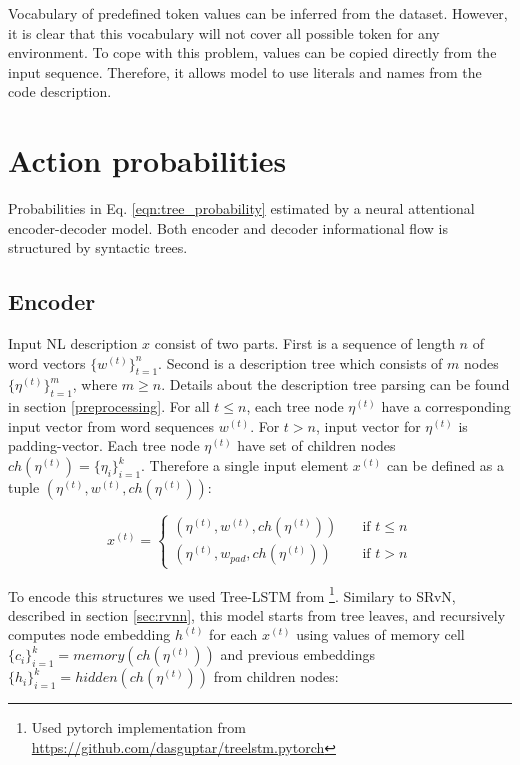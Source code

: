 Vocabulary of predefined token values can be inferred from the dataset. However, it is clear that this vocabulary will not cover all possible token for any environment. To cope with this problem, values can be copied directly from the input sequence. Therefore, it allows model to use literals and names from the code description.

\section{Action probabilities}
Probabilities in Eq. \ref{eqn:tree_probability} estimated by a neural attentional encoder-decoder model. Both encoder and decoder informational flow is structured by syntactic trees. 

\subsection{Encoder}
Input NL description $x$ consist of two parts. First is a sequence of length $n$ of word vectors $\{w^{(t)}\}^n_{t=1}$. Second is a description tree which consists of $m$ nodes $\{\eta^{(t)}\}^m_{t=1}$, where $m\geq n$. Details about the description tree parsing can be found in section \ref{preprocessing}. For all $t \leq n$, each tree node $\eta^{(t)}$ have a corresponding input vector from word sequences $w^{(t)}$. For $t > n$, input vector for $\eta^{(t)}$ is padding-vector. Each tree node $\eta^{(t)}$ have set of children nodes $ch(\eta^{(t)})=\{\eta_{i}\}^k_{i=1}$. Therefore a single input element $x^{(t)}$ can be defined as a tuple $(\eta^{(t)}, w^{(t)}, ch(\eta^{(t)}))$:

\begin{equation}
 x^{(t)} =
  \begin{cases}
    (\eta^{(t)}, w^{(t)}, ch(\eta^{(t)}))  & \quad \text{if } t\leq n\\
    (\eta^{(t)}, w_{pad}, ch(\eta^{(t)}))  & \quad \text{if } t > n
  \end{cases}
\label{eq:enc_input}
\end{equation}

To encode this structures we used Tree-LSTM from \cite{Tai2015}\footnote{Used pytorch implementation from \href{https://github.com/dasguptar/treelstm.pytorch}{https://github.com/dasguptar/treelstm.pytorch}}. Similary to SRvN, described in section \ref{sec:rvnn}, this model starts from tree leaves, and recursively computes node embedding $h^{(t)}$ for each $x^{(t)}$ using values of memory cell $\{c_i\}^{k}_{i=1} = memory(ch(\eta^{(t)}))$ and previous  embeddings $\{h_i\}^{k}_{i=1} = hidden(ch(\eta^{(t)}))$ from children nodes:

